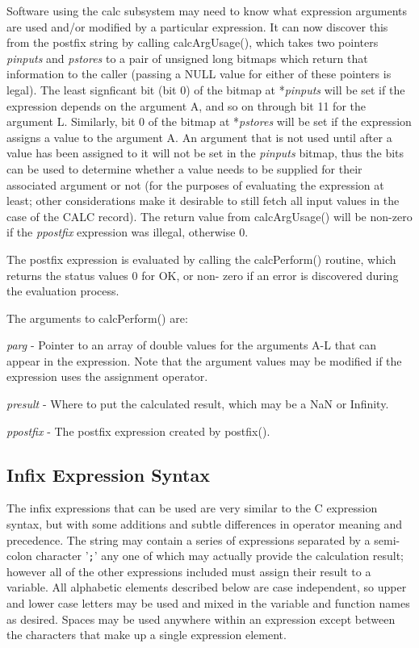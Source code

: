 Software using the calc subsystem may need to know what expression arguments are used and/or modified by a particular 
expression. It can now discover this from the postfix string by calling calcArgUsage(), which takes two pointers \emph{pinputs} 
and \emph{pstores} to a pair of unsigned long bitmaps which return that information to the caller (passing a NULL value for either 
of these pointers is legal). The least signficant bit (bit 0) of the bitmap at *\emph{pinputs} will be set if the expression depends on 
the argument A, and so on through bit 11 for the argument L. Similarly, bit 0 of the bitmap at *\emph{pstores} will be set if the 
expression assigns a value to the argument A. An argument that is not used until after a value has been assigned to it will 
not be set in the \emph{pinputs} bitmap, thus the bits can be used to determine whether a value needs to be supplied for their 
associated argument or not (for the purposes of evaluating the expression at least; other considerations make it desirable 
to still fetch all input values in the case of the CALC record). The return value from calcArgUsage() will be non-zero if 
the \emph{ppostfix} expression was illegal, otherwise 0.

The postfix expression is evaluated by calling the calcPerform() routine, which returns the status values 0 for OK, or non-
zero if an error is discovered during the evaluation process.

The arguments to calcPerform() are:

\begin{description}\item \emph{parg} - Pointer to an array of double values for the arguments A-L that can appear in the expression. Note that the 
argument values may be modified if the expression uses the assignment operator.

\item \emph{presult} - Where to put the calculated result, which may be a NaN or Infinity.

\item \emph{ppostfix} - The postfix expression created by postfix().

\end{description}\subsection{Infix Expression Syntax}

The infix expressions that can be used are very similar to the C expression syntax, but with some additions and subtle 
differences in operator meaning and precedence. The string may contain a series of expressions separated by a semi-colon 
character '\verb|;|' any one of which may actually provide the calculation result; however all of the other expressions included 
must assign their result to a variable. All alphabetic elements described below are case independent, so upper and lower 
case letters may be used and mixed in the variable and function names as desired. Spaces may be used anywhere within an 
expression except between the characters that make up a single expression element.

